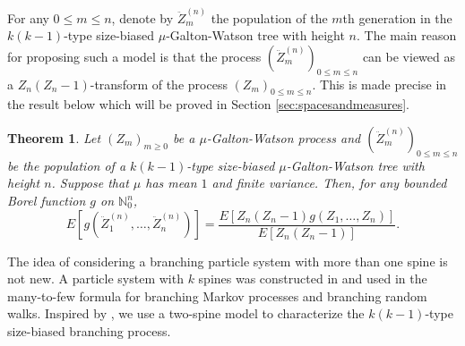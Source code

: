\documentclass[UTF8]{pkuthss}
\theoremstyle{plain}
\newtheorem{thm}{Theorem}[section]
\theoremstyle{definition}
\numberwithin{equation}{section}
\begin{document}
For any $0\le m \le n$, denote by $\ddot Z_m^{(n)}$ the population of the $m$th generation in the $k(k-1)$-type size-biased $\mu$-Galton-Watson tree with height $n$.
The main reason for proposing such a model is that the process $(\ddot Z_m^{(n)})_{0\le m\le n}$ can be viewed as
a $Z_n(Z_n-1)$-transform of the process $(Z_m)_{0\le m\le n}$.
This is made precise in the result below which will be proved in Section \ref{sec:spacesandmeasures}.
\begin{thm}
	\label{thm: change of measure}
	Let $(Z_m)_{m\ge 0}$ be a $\mu$-Galton-Watson process and $(\ddot Z_m^{(n)})_{0\le m\le n}$ be the population of a $k(k-1)$-type size-biased $\mu$-Galton-Watson tree with height $n$.
	Suppose that $\mu$ has mean $1$ and finite variance.
	Then, for any bounded Borel function $g$ on $\mathbb N^{n}_0$,
	\[
	E[ g ( \ddot Z_1^{(n)}, \dots, \ddot Z_n^{(n)})]
	=
	\frac{ E[ Z_n(Z_n-1) g( Z_1, \dots, Z_n)]} {E [ Z_n ( Z_n - 1)]}.		
	\]
\end{thm}

The idea of considering a branching particle system with more than one spine is not new.
A particle system with $k$ spines  was constructed in \cite{HarrisRoberts2017The-many-to-few} and used in the  many-to-few formula for branching Markov processes and branching random walks.
Inspired by \cite{HarrisRoberts2017The-many-to-few}, we use a two-spine model to characterize the $k(k-1)$-type size-biased branching process.
\end{document}
